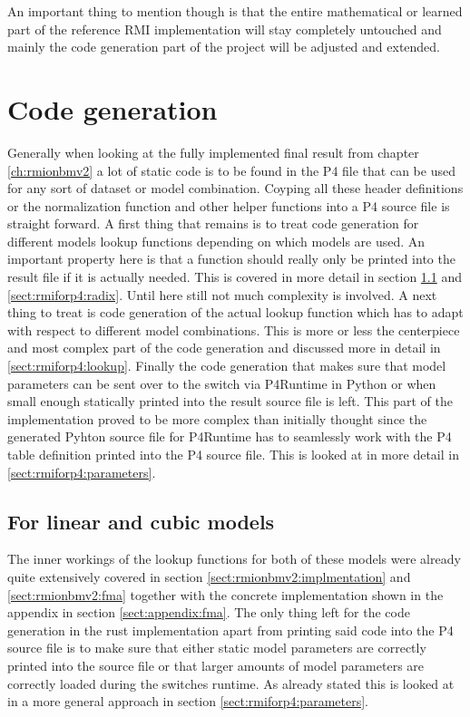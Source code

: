 An important thing to mention though is that the entire mathematical or learned part of the reference RMI implementation will stay completely untouched and mainly the code generation part of the project will be adjusted and extended.

\section{Code generation}
Generally when looking at the fully implemented final result from chapter \ref{ch:rmionbmv2} a lot of static code is to be found in the P4 file that can be used for any sort of dataset or model combination. Coyping all these header definitions or the normalization function and other helper functions into a P4 source file is straight forward. A first thing that remains is to treat code generation for different models lookup functions depending on which models are used. An important property here is that a function should really only be printed into the result file if it is actually needed. This is covered in more detail in section \ref{sect:rmiforp4:linear_cubic} and \ref{sect:rmiforp4:radix}. Until here still not much complexity is involved. A next thing to treat is code generation of the actual lookup function which has to adapt with respect to different model combinations. This is more or less the centerpiece and most complex part of the code generation and discussed more in detail in \ref{sect:rmiforp4:lookup}. Finally the code generation that makes sure that model parameters can be sent over to the switch via P4Runtime in Python or when small enough statically printed into the result source file is left. This part of the implementation proved to be more complex than initially thought since the generated Pyhton source file for P4Runtime has to seamlessly work with the P4 table definition printed into the P4 source file. This is looked at in more detail in \ref{sect:rmiforp4:parameters}.

\subsection{For linear and cubic models}
\label{sect:rmiforp4:linear_cubic}
The inner workings of the lookup functions for both of these models were already quite extensively covered in section \ref{sect:rmionbmv2:implmentation} and \ref{sect:rmionbmv2:fma} together with the concrete implementation shown in the appendix in section \ref{sect:appendix:fma}. The only thing left for the code generation in the rust implementation apart from printing said code into the P4 source file is to make sure that either static model parameters are correctly printed into the source file or that larger amounts of model parameters are correctly loaded during the switches runtime. As already stated this is looked at in a more general approach in section \ref{sect:rmiforp4:parameters}.

